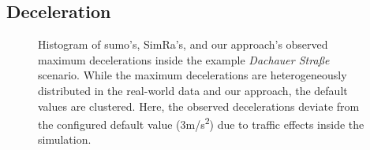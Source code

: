 \subsection{Deceleration}
\label{subsec:deceleration_evaluation}
\begin{figure}
    \centering
    \hfill
    \caption{%
        Histogram of \ac{sumo}'s, SimRa's, and our approach's observed maximum decelerations inside the example \textit{Dachauer Straße} scenario.
        While the maximum decelerations are heterogeneously distributed in the real-world data and our approach, the default values are clustered.
        Here, the observed decelerations deviate from the configured default value (3m/s\textsuperscript{2}) due to traffic effects inside the simulation.
    }%
    \label{fig:eval_dec}
\end{figure}

